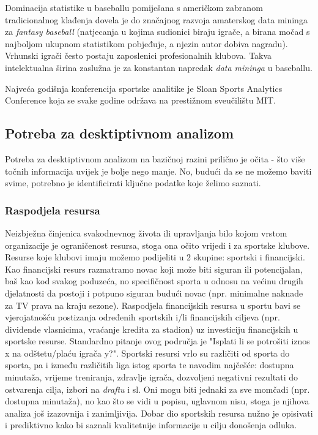 \documentclass{ferseminar}
\begin{document}
Dominacija statistike u baseballu pomiješana s američkom zabranom tradicionalnog klađenja dovela je do značajnog razvoja amaterskog data mininga za \textit{fantasy baseball} (natjecanja u kojima sudionici biraju igrače, a birana močad s najboljom ukupnom statistikom pobjeđuje, a njezin autor dobiva nagradu). Vrhunski igrači često postaju zaposlenici profesionalnih klubova. Takva intelektualna širina zaslužna je za konstantan napredak \textit{data mininga} u baseballu.

Najveća godišnja konferencija sportske analitike je Sloan Sports Analytics Conference koja se svake godine održava na prestižnom sveučilištu MIT. \cite{Sloan}

\subsection{Potreba za desktiptivnom analizom}

Potreba za desktiptivnom analizom na bazičnoj razini prilično je očita - što više točnih informacija uvijek je bolje nego manje. No, budući da se ne možemo baviti svime, potrebno je identificirati ključne podatke koje želimo saznati.

\subsubsection{Raspodjela resursa}
Neizbježna činjenica svakodnevnog života ili upravljanja bilo kojom vrstom organizacije je ograničenost resursa, stoga ona očito vrijedi i za sportske klubove. Resurse koje klubovi imaju možemo podijeliti u 2 skupine: sportski i financijski. 
\newline
Kao financijski resurs razmatramo novac koji može biti siguran ili potencijalan, baš kao kod svakog poduzeća, no specifičnost sporta u odnosu na većinu drugih djelatnosti da postoji i potpuno siguran budući novac (npr. minimalne naknade za TV prava na kraju sezone). Raspodjela financijskih resursa u sportu bavi se vjerojatnošću postizanja određenih sportskih i/li financijskih ciljeva (npr. dividende vlasnicima, vraćanje kredita za stadion) uz investiciju financijskih u sportske resurse. Standardno pitanje ovog područja je "Isplati li se potrošiti 
iznos x na odštetu/plaću igrača y?".
\newline
Sportski resursi vrlo su različiti od sporta do sporta, pa i između različitih liga istog sporta te navodim najčešće: dostupna minutaža, vrijeme treniranja, zdravlje igrača, dozvoljeni negativni rezultati do ostvarenja cilja, izbori na \textit{draftu} i sl. Oni mogu biti jednaki za sve momčadi (npr. dostupna minutaža), no kao što se vidi u popisu, uglavnom nisu, stoga je njihova analiza još izazovnija i zanimljivija. Dobar dio sportskih resursa nužno je opisivati i prediktivno kako bi saznali kvalitetnije informacije u cilju donošenja odluka.
\end{document}
